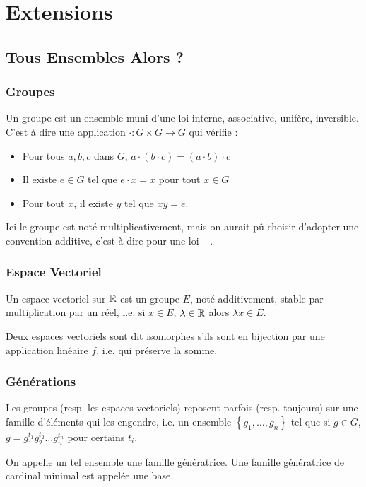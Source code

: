 \documentclass{beamercours}
\begin{document}
\section{Extensions}

\subsection{Tous Ensembles Alors ?}

\begin{frame}
    \frametitle{Groupes}
    Un groupe est un ensemble muni d'une loi interne, associative, unifère, inversible. C'est à dire une application $\cdot : G \times G \rightarrow G$ qui vérifie : 
    \begin{itemize}
        \item Pour tous $a, b, c$ dans $G$, $a \cdot (b \cdot c) = (a\cdot b) \cdot c$
        \item Il existe $e \in G$ tel que $e \cdot x = x$ pour tout $x \in G$
        \item Pour tout $x$, il existe $y$ tel que $xy = e$.
    \end{itemize}
    Ici le groupe est noté multiplicativement, mais on aurait pû choisir d'adopter une convention additive, c'est à dire pour une loi $+$.
\end{frame}

\begin{frame}
    \frametitle{Espace Vectoriel}
    Un espace vectoriel sur $\mathbb{R}$ est un groupe $E$, noté additivement, stable par multiplication par un réel, i.e. si $x \in E$, $\lambda \in \mathbb{R}$ alors $\lambda x \in E$.
    
    Deux espaces vectoriels sont dit isomorphes s'ils sont en bijection par une application linéaire $f$, i.e. qui préserve la somme.

\end{frame}

\begin{frame}
    \frametitle{Générations}
    Les groupes (resp. les espaces vectoriels) reposent parfois (resp. toujours) sur une famille d'éléments qui les engendre, i.e. un ensemble $\left\{g_{1},\ldots, g_{n}\right\}$ tel que si $g \in G$, $g = g_{1}^{t_{1}}g_{2}^{t_{2}}\ldots g_{n}^{t_{n}}$ pour certains $t_{i}$.
    
    On appelle un tel ensemble une famille génératrice. Une famille génératrice de cardinal minimal est appelée une base.

    
\end{frame}
\end{document}
